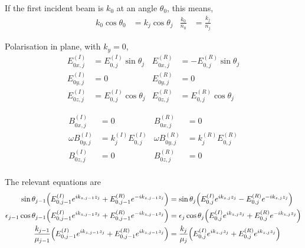 If the first incident beam is $k_0$ at an angle $\theta_0$, this means,
\begin{align*}
	k_{0}\cos\theta_{0} &= k_{j}\cos\theta_{j} & \frac{k_0}{n_0} &= \frac{k_j}{n_j}
\end{align*}




Polarisation in plane, with $k_y = 0$,
\begin{align*}
	E^{(I)}_{0x,j} &= E^{(I)}_{0,j}\sin\theta_j & E^{(R)}_{0x,j} &= -E^{(R)}_{0,j}\sin\theta_j \\
	E^{(I)}_{0y,j} &= 0 & E^{(R)}_{0y,j} &= 0 \\
	E^{(I)}_{0z,j} &= E^{(I)}_{0,j}\cos\theta_j & E^{(R)}_{0z,j} &= E^{(R)}_{0,j}\cos\theta_j
\end{align*}

\begin{align*}
	B^{(I)}_{0x,j} &= 0 & B^{(R)}_{0x,j} &= 0 \\
	\omega B^{(I)}_{0y,j} &= k^{(I)}_jE^{(I)}_{0,j} & \omega B^{(R)}_{0y,j} &= k^{(R)}_jE^{(R)}_{0,j} \\
	B^{(I)}_{0z,j} &= 0 & B^{(R)}_{0z,j} &= 0 \\
\end{align*}

The relevant equations are
\begin{align*}
	\sin\theta_{j-1}\pqty{E^{(I)}_{0,j-1}e^{ik_{z,j-1}z_j} + E^{(R)}_{0,j-1}e^{-ik_{z,j-1}z_j}} &=
	\sin\theta_{j}\pqty{E^{(I)}_{0,j}e^{ik_{z,j}z_j} - E^{(R)}_{0,j}e^{-ik_{z,j}z_j}} 
	\\
	\epsilon_{j-1} \cos\theta_{j-1} \pqty{E^{(I)}_{0,j-1}e^{ik_{z,j-1}z_j} + E^{(R)}_{0,j-1}e^{-ik_{z,j-1}z_j}} &=
	\epsilon_{j} \cos\theta_{j} \pqty{E^{(I)}_{0,j}e^{ik_{z,j}z_j} + E^{(R)}_{0,j} e^{-ik_{z,j}z_j}} 
	\\
	\frac{k_{j-1}}{\mu_{j-1}}\pqty{E^{(I)}_{0,j-1} e^{ik_{z,j-1}z_j} + E^{(R)}_{0,j-1} e^{ik_{z,j-1}z_j}} &=
	\frac{k_{j}}{\mu_{j}}\pqty{E^{(I)}_{0,j} e^{ik_{z,j}z_j} + E^{(R)}_{0,j} e^{ik_{z,j}z_j}}
\end{align*}

